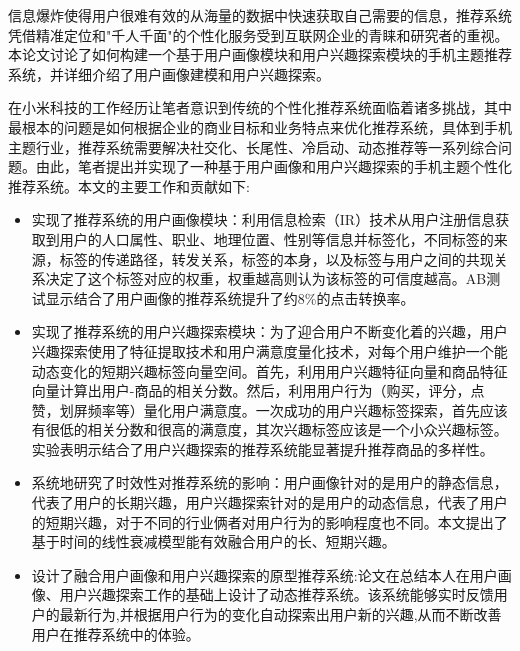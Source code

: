 \begin{cnabstract}
信息爆炸使得用户很难有效的从海量的数据中快速获取自己需要的信息，推荐系统凭借精准定位和"千人千面"的个性化服务受到互联网企业的青睐和研究者的重视。本论文讨论了如何构建一个基于用户画像模块和用户兴趣探索模块的手机主题推荐系统，并详细介绍了用户画像建模和用户兴趣探索。

在小米科技的工作经历让笔者意识到传统的个性化推荐系统面临着诸多挑战，其中最根本的问题是如何根据企业的商业目标和业务特点来优化推荐系统，具体到手机主题行业，推荐系统需要解决社交化、长尾性、冷启动、动态推荐等一系列综合问题。由此，笔者提出并实现了一种基于用户画像和用户兴趣探索的手机主题个性化推荐系统。本文的主要工作和贡献如下:
\begin{itemize}
	\item 实现了推荐系统的用户画像模块：利用信息检索（IR）技术从用户注册信息获取到用户的人口属性、职业、地理位置、性别等信息并标签化，不同标签的来源，标签的传递路径，转发关系，标签的本身，以及标签与用户之间的共现关系决定了这个标签对应的权重，权重越高则认为该标签的可信度越高。AB测试显示结合了用户画像的推荐系统提升了约8\%的点击转换率。
	\item 实现了推荐系统的用户兴趣探索模块：为了迎合用户不断变化着的兴趣，用户兴趣探索使用了特征提取技术和用户满意度量化技术，对每个用户维护一个能动态变化的短期兴趣标签向量空间。首先，利用用户兴趣特征向量和商品特征向量计算出用户-商品的相关分数。然后，利用用户行为（购买，评分，点赞，划屏频率等）量化用户满意度。一次成功的用户兴趣标签探索，首先应该有很低的相关分数和很高的满意度，其次兴趣标签应该是一个小众兴趣标签。实验表明示结合了用户兴趣探索的推荐系统能显著提升推荐商品的多样性。
	\item 系统地研究了时效性对推荐系统的影响：用户画像针对的是用户的静态信息，代表了用户的长期兴趣，用户兴趣探索针对的是用户的动态信息，代表了用户的短期兴趣，对于不同的行业俩者对用户行为的影响程度也不同。本文提出了基于时间的线性衰减模型能有效融合用户的长、短期兴趣。
	\item 设计了融合用户画像和用户兴趣探索的原型推荐系统:论文在总结本人在用户画像、用户兴趣探索工作的基础上设计了动态推荐系统。该系统能够实时反馈用户的最新行为,并根据用户行为的变化自动探索出用户新的兴趣,从而不断改善用户在推荐系统中的体验。
\end{itemize}

\end{cnabstract}

\begin{enabstract}


\end{enabstract}
